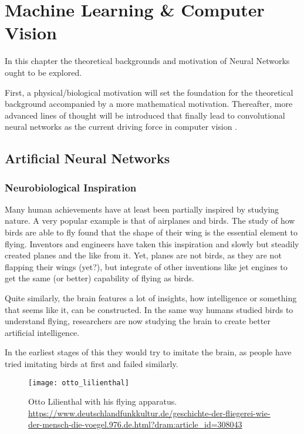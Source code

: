 \setchapterpreamble[u]{\margintoc}
\chapter{Machine Learning \& Computer Vision}
In this chapter the theoretical backgrounds and motivation of Neural Networks ought to be explored.

First, a physical/biological motivation will set the foundation for the theoretical background accompanied by a more mathematical motivation.
Thereafter, more advanced lines of thought will be introduced that finally lead to convolutional neural networks as the current driving force in computer vision .

\section[Artificial NNs]{Artificial Neural Networks}

\subsection[Inspiration]{Neurobiological Inspiration}

Many human achievements have at least been partially inspired by studying nature.
A very popular example is that of airplanes and birds.
The study of how birds are able to fly found that the shape of their wing is the essential element to flying.
Inventors and engineers have taken this inspiration and slowly but steadily created planes and the like from it.
Yet, planes are not birds, as they are not flapping their wings (yet?), but integrate of other inventions like jet engines to get the same (or better) capability of flying as birds.

Quite similarly, the brain features a lot of insights, how intelligence or something that seems like it, can be constructed.
In the same way humans studied birds to understand flying, researchers are now studying the brain to create better artificial intelligence.

In the earliest stages of this they would try to imitate the brain, as people have tried imitating birds at first and failed similarly.
\begin{figure}
    \texttt{[image: otto\_lilienthal]}
    \caption[]{Otto Lilienthal with his flying apparatus. \url{https://www.deutschlandfunkkultur.de/geschichte-der-fliegerei-wie-der-mensch-die-voegel.976.de.html?dram:article_id=308043}}
\end{figure}

